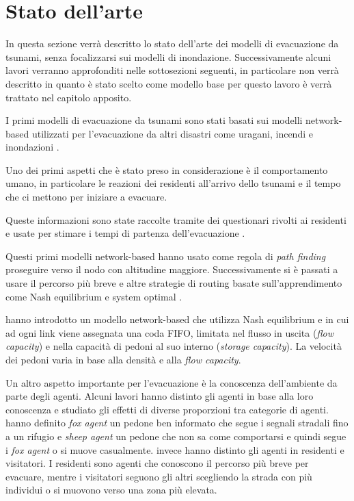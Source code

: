 \section{Stato dell'arte}
\label{sec:stato-arte}
In questa sezione verrà descritto lo stato dell'arte dei modelli di evacuazione da tsunami, senza focalizzarsi sui modelli di inondazione.
Successivamente alcuni lavori verranno approfonditi nelle sottosezioni seguenti,
in particolare \textcite{wang2016agent} non verrà descritto in quanto è stato scelto
come modello base per questo lavoro è verrà trattato nel capitolo apposito.

I primi modelli di evacuazione da tsunami sono stati basati sui modelli network-based utilizzati per l'evacuazione da altri disastri come
uragani, incendi e inondazioni \parencite{usuzawa1997development, imamura2001development}.

Uno dei primi aspetti che è stato preso in considerazione è il comportamento umano,
in particolare le reazioni dei residenti all'arrivo dello tsunami
e il tempo che ci mettono per iniziare a evacuare.

Queste informazioni sono state raccolte tramite dei questionari rivolti ai residenti
e usate per stimare i tempi di partenza dell'evacuazione \parencite{imamura2001development, saito2004simulation}.

Questi primi modelli network-based hanno usato come regola di \textit{path finding}
proseguire verso il nodo con altitudine maggiore.
Successivamente si è passati a usare il percorso
più breve \parencite{katada2004disaster} e altre strategie di routing basate sull'apprendimento 
come Nash equilibrium e system optimal \parencite{lammel2009towards}.

\textcite{lammel2010emergency} hanno introdotto un modello network-based che utilizza Nash equilibrium e in cui ad ogni link viene assegnata una coda FIFO,
limitata nel flusso in uscita (\textit{flow capacity}) e nella capacità di pedoni al suo interno (\textit{storage capacity}).
La velocità dei pedoni varia in base alla densità e alla \textit{flow capacity}.

Un altro aspetto importante per l'evacuazione è la conoscenza dell'ambiente da parte degli agenti.
Alcuni lavori hanno distinto gli agenti in base alla loro conoscenza e
studiato gli effetti di diverse proporzioni tra categorie di agenti.
\textcite{nguyen2012simulation} hanno definito \textit{fox agent} un pedone ben informato che segue i segnali
stradali fino a un rifugio e \textit{sheep agent} un pedone che non sa
come comportarsi e quindi segue i \textit{fox agent} o si muove casualmente.
\textcite{takabatake2017simulated} invece hanno distinto gli agenti in residenti e visitatori.
I residenti sono agenti che conoscono il percorso più breve per evacuare, mentre i visitatori
seguono gli altri scegliendo la strada con più individui o si muovono verso una zona più elevata.

